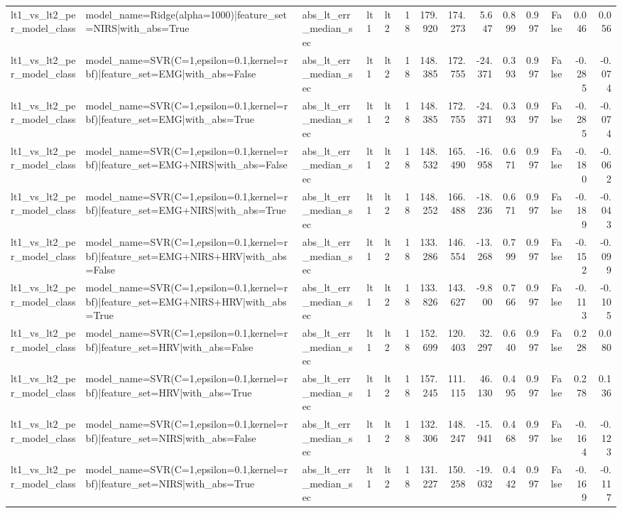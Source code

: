 \begin{table}
\begin{tabular}{lllllrrrrrrrrr}
lt1_vs_lt2_per_model_class & model_name=Ridge(alpha=1000)|feature_set=NIRS|with_abs=True & abs_lt_err_median_sec & lt1 & lt2 & 18 & 179.920 & 174.273 & 5.647 & 0.899 & 0.997 & False & 0.046 & 0.056 \\
lt1_vs_lt2_per_model_class & model_name=SVR(C=1,epsilon=0.1,kernel=rbf)|feature_set=EMG|with_abs=False & abs_lt_err_median_sec & lt1 & lt2 & 18 & 148.385 & 172.755 & -24.371 & 0.393 & 0.997 & False & -0.285 & -0.074 \\
lt1_vs_lt2_per_model_class & model_name=SVR(C=1,epsilon=0.1,kernel=rbf)|feature_set=EMG|with_abs=True & abs_lt_err_median_sec & lt1 & lt2 & 18 & 148.385 & 172.755 & -24.371 & 0.393 & 0.997 & False & -0.285 & -0.074 \\
lt1_vs_lt2_per_model_class & model_name=SVR(C=1,epsilon=0.1,kernel=rbf)|feature_set=EMG+NIRS|with_abs=False & abs_lt_err_median_sec & lt1 & lt2 & 18 & 148.532 & 165.490 & -16.958 & 0.671 & 0.997 & False & -0.180 & -0.062 \\
lt1_vs_lt2_per_model_class & model_name=SVR(C=1,epsilon=0.1,kernel=rbf)|feature_set=EMG+NIRS|with_abs=True & abs_lt_err_median_sec & lt1 & lt2 & 18 & 148.252 & 166.488 & -18.236 & 0.671 & 0.997 & False & -0.189 & -0.043 \\
lt1_vs_lt2_per_model_class & model_name=SVR(C=1,epsilon=0.1,kernel=rbf)|feature_set=EMG+NIRS+HRV|with_abs=False & abs_lt_err_median_sec & lt1 & lt2 & 18 & 133.286 & 146.554 & -13.268 & 0.799 & 0.997 & False & -0.152 & -0.099 \\
lt1_vs_lt2_per_model_class & model_name=SVR(C=1,epsilon=0.1,kernel=rbf)|feature_set=EMG+NIRS+HRV|with_abs=True & abs_lt_err_median_sec & lt1 & lt2 & 18 & 133.826 & 143.627 & -9.800 & 0.766 & 0.997 & False & -0.113 & -0.105 \\
lt1_vs_lt2_per_model_class & model_name=SVR(C=1,epsilon=0.1,kernel=rbf)|feature_set=HRV|with_abs=False & abs_lt_err_median_sec & lt1 & lt2 & 18 & 152.699 & 120.403 & 32.297 & 0.640 & 0.997 & False & 0.228 & 0.080 \\
lt1_vs_lt2_per_model_class & model_name=SVR(C=1,epsilon=0.1,kernel=rbf)|feature_set=HRV|with_abs=True & abs_lt_err_median_sec & lt1 & lt2 & 18 & 157.245 & 111.115 & 46.130 & 0.495 & 0.997 & False & 0.278 & 0.136 \\
lt1_vs_lt2_per_model_class & model_name=SVR(C=1,epsilon=0.1,kernel=rbf)|feature_set=NIRS|with_abs=False & abs_lt_err_median_sec & lt1 & lt2 & 18 & 132.306 & 148.247 & -15.941 & 0.468 & 0.997 & False & -0.164 & -0.123 \\
lt1_vs_lt2_per_model_class & model_name=SVR(C=1,epsilon=0.1,kernel=rbf)|feature_set=NIRS|with_abs=True & abs_lt_err_median_sec & lt1 & lt2 & 18 & 131.227 & 150.258 & -19.032 & 0.442 & 0.997 & False & -0.169 & -0.117 \\

\end{tabular}
\end{table}
